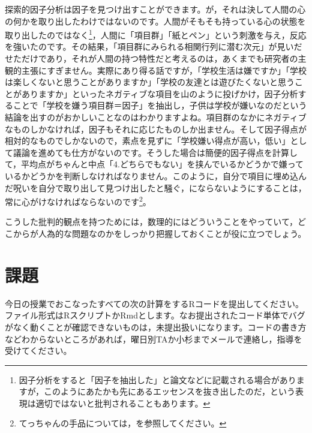 \documentclass{ltjsbook}
\begin{document}
探索的因子分析は因子を見つけ出すことができます。が，それは決して人間の心の何かを取り出したわけではないのです。人間がそもそも持っている心の状態を取り出したのではなく\footnote{因子分析をすると「因子を抽出した」と論文などに記載される場合がありますが，このようにあたかも先にあるエッセンスを抜き出したのだ，という表現は適切ではないと批判されることもあります。}，人間に「項目群」「紙とペン」という刺激を与え，反応を強いたのです。その結果，「項目群にみられる相関行列に潜む次元」が見いだせただけであり，それが人間の持つ特性だと考えるのは，あくまでも研究者の主観的主張にすぎません。実際にあり得る話ですが，「学校生活は嫌ですか」「学校は楽しくないと思うことがありますか」「学校の友達とは遊びたくないと思うことがありますか」といったネガティブな項目を山のように投げかけ，因子分析することで「学校を嫌う項目群＝因子」を抽出し，子供は学校が嫌いなのだという結論を出すのがおかしいことなのはわかりますよね。項目群のなかにネガティブなものしかなければ，因子もそれに応じたものしか出ません。そして因子得点が相対的なものでしかないので，素点を見ずに「学校嫌い得点が高い，低い」として議論を進めても仕方がないのです。そうした場合は簡便的因子得点を計算して，平均点がちゃんと中点「4.どちらでもない」を挟んでいるかどうかで嫌っているかどうかを判断しなければなりません。このように，自分で項目に埋め込んだ呪いを自分で取り出して見つけ出したと騒ぐ，にならないようにすることは，常に心がけなければならないのです\footnote{てっちゃんの手品については，\textcite{kosugi2018}を参照してください。}。

こうした批判的観点を持つためには，数理的にはどういうことをやっていて，どこからが人為的な問題なのかをしっかり把握しておくことが役に立つでしょう。

\section{課題}
今日の授業でおこなったすべての次の計算をするRコードを提出してください。ファイル形式はRスクリプトかRmdとします。なお提出されたコード単体でバグがなく動くことが確認できないものは，未提出扱いになります。コードの書き方などわからないところがあれば，曜日別TAか小杉までメールで連絡し，指導を受けてください。
\end{document}
